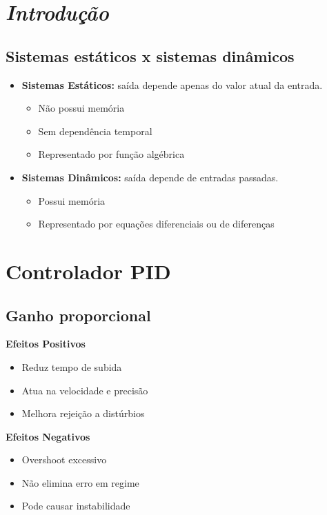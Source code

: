 \documentclass[journal]{IEEEtran}
\begin{document}
\section{\textit{Introdução}}

\subsection{Sistemas estáticos x sistemas dinâmicos}
\begin{itemize}
    \item \textbf{Sistemas Estáticos:} saída depende apenas do valor atual da entrada.
    \begin{itemize}
        \item Não possui memória
        \item Sem dependência temporal
        \item Representado por função algébrica
    \end{itemize}
    \item \textbf{Sistemas Dinâmicos:} saída depende de entradas passadas.
    \begin{itemize}
        \item Possui memória
        \item Representado por equações diferenciais ou de diferenças
    \end{itemize}
\end{itemize}

\section{Controlador PID}

\subsection{Ganho proporcional}

\textbf{Efeitos Positivos}
\begin{itemize}
    \item Reduz tempo de subida
    \item Atua na velocidade e precisão
    \item Melhora rejeição a distúrbios
\end{itemize}

\textbf{Efeitos Negativos}
\begin{itemize}
    \item Overshoot excessivo
    \item Não elimina erro em regime
    \item Pode causar instabilidade
\end{itemize}
\end{document}
